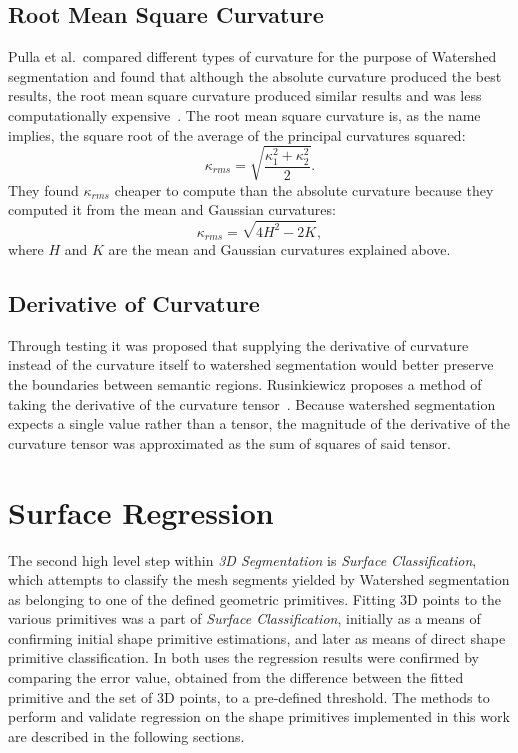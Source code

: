 \subsection{Root Mean Square Curvature}
Pulla et al.\ compared different types of curvature for the purpose of Watershed segmentation and found that although the absolute curvature produced the best results, the root mean square curvature produced similar results and was less computationally expensive~\cite{Imp_k_estimation_for_WS}.
The root mean square curvature is, as the name implies, the square root of the average of the principal curvatures squared:
\begin{equation*}
	\kappa_{rms} = \sqrt{\frac{\kappa_1^2 + \kappa_2^2}{2}}.
\end{equation*}
They found $\kappa_{rms}$ cheaper to compute than the absolute curvature because they computed it from the mean and Gaussian curvatures:
\begin{equation*}
	\kappa_{rms} = \sqrt{4H^2 - 2K},
\end{equation*}
where $H$ and $K$ are the mean and Gaussian curvatures explained above.

\subsection{Derivative of Curvature}
Through testing it was proposed that supplying the derivative of curvature instead of the curvature itself to watershed segmentation would better preserve the boundaries between semantic regions.
Rusinkiewicz proposes a method of taking the derivative of the curvature tensor~\cite{SRTensor}.
Because watershed segmentation expects a single value rather than a tensor, the magnitude of the derivative of the curvature tensor was approximated as the sum of squares of said tensor.

\section{Surface Regression}
The second high level step within \textit{3D Segmentation} is \textit{Surface Classification}, which attempts to classify the mesh segments yielded by Watershed segmentation as belonging to one of the defined geometric primitives.
Fitting 3D points to the various primitives was a part of \textit{Surface Classification}, initially as a means of confirming initial shape primitive estimations, and later as means of direct shape primitive classification.
In both uses the regression results were confirmed by comparing the error value, obtained from the difference between the fitted primitive and the set of 3D points, to a pre-defined threshold.
The methods to perform and validate regression on the shape primitives implemented in this work are described in the following sections.

